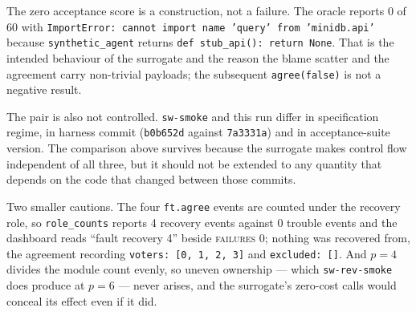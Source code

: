 \documentclass[11pt]{article}
\begin{document}
The zero acceptance score is a construction, not a failure. The oracle reports 0 of 60 with
\texttt{ImportError: cannot import name 'query' from 'minidb.api'} because
\texttt{synthetic\_agent} returns \texttt{def stub\_api(): return None}. That is the intended
behaviour of the surrogate and the reason the blame scatter and the agreement carry non-trivial
payloads; the subsequent \texttt{agree(false)} is not a negative result.

The pair is also not controlled. \texttt{sw-smoke} and this run differ in specification regime,
in harness commit (\texttt{b0b652d} against \texttt{7a3331a}) and in acceptance-suite version.
The comparison above survives because the surrogate makes control flow independent of all
three, but it should not be extended to any quantity that depends on the code that changed
between those commits.

Two smaller cautions. The four \texttt{ft.agree} events are counted under the recovery role, so
\texttt{role\_counts} reports 4 recovery events against 0 trouble events and the dashboard
reads ``fault recovery 4'' beside \textsc{failures} 0; nothing was recovered from, the
agreement recording \texttt{voters: [0, 1, 2, 3]} and \texttt{excluded: []}. And $p = 4$
divides the module count evenly, so uneven ownership --- which \texttt{sw-rev-smoke} does
produce at $p = 6$ --- never arises, and the surrogate's zero-cost calls would conceal its
effect even if it did.
\end{document}
